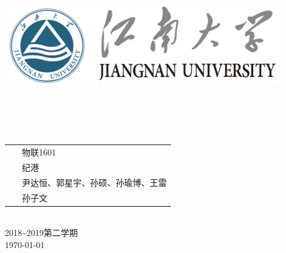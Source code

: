\documentclass[a4paper]{ctexart}
\begin{document}
\begin{titlepage}
	\begin{center}
    \includegraphics[width=0.9\textwidth]{figure//Njust.png}\\
    \vspace{10mm}
    \\[0.5cm]
    \\[2.5cm]
    \\
    \\[2.5cm]
	\vspace{\fill}
	\setlength{\extrarowheight}{3mm}
	{\songti{}	
		\begin{tabular}{rl}
			{\makebox[4\ccwd][s]{班\qquad 级：}}& ~\kaishu 物联1601\\
			{\makebox[4\ccwd][s]{组\qquad 长：}}& ~\kaishu 纪港 \\
			{\makebox[4\ccwd][s]{组\qquad 员：}}& ~\kaishu 尹达恒、郭星宇、孙硕、孙瑜博、王雷 \\
			{\makebox[4\ccwd][s]{指导老师：}} & ~\kaishu 孙子文\\
		\end{tabular}
	}\\[2cm]
	\vspace{\fill}
	2018\textasciitilde 2019第二学期\\
	\today
	\end{center}
\restoregeometry
\end{titlepage}


\tableofcontents
\newpage
\end{document}
